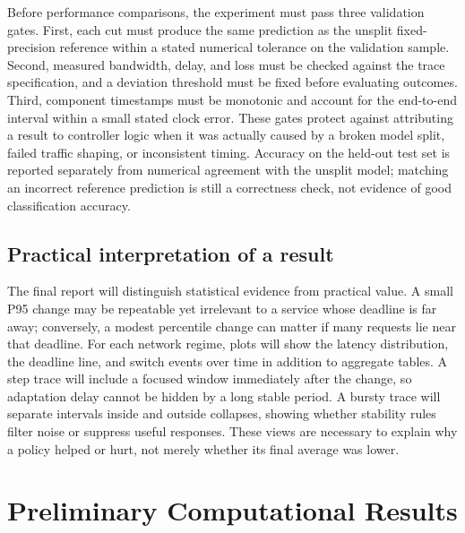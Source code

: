 \documentclass[10pt,a4paper,twocolumn]{article}
\begin{document}
Before performance comparisons, the experiment must pass three validation gates. First, each cut must produce the same prediction as the unsplit fixed-precision reference within a stated numerical tolerance on the validation sample. Second, measured bandwidth, delay, and loss must be checked against the trace specification, and a deviation threshold must be fixed before evaluating outcomes. Third, component timestamps must be monotonic and account for the end-to-end interval within a small stated clock error. These gates protect against attributing a result to controller logic when it was actually caused by a broken model split, failed traffic shaping, or inconsistent timing. Accuracy on the held-out test set is reported separately from numerical agreement with the unsplit model; matching an incorrect reference prediction is still a correctness check, not evidence of good classification accuracy.

\subsection{Practical interpretation of a result}
The final report will distinguish statistical evidence from practical value. A small P95 change may be repeatable yet irrelevant to a service whose deadline is far away; conversely, a modest percentile change can matter if many requests lie near that deadline. For each network regime, plots will show the latency distribution, the deadline line, and switch events over time in addition to aggregate tables. A step trace will include a focused window immediately after the change, so adaptation delay cannot be hidden by a long stable period. A bursty trace will separate intervals inside and outside collapses, showing whether stability rules filter noise or suppress useful responses. These views are necessary to explain why a policy helped or hurt, not merely whether its final average was lower.

\section{Preliminary Computational Results}
\end{document}
